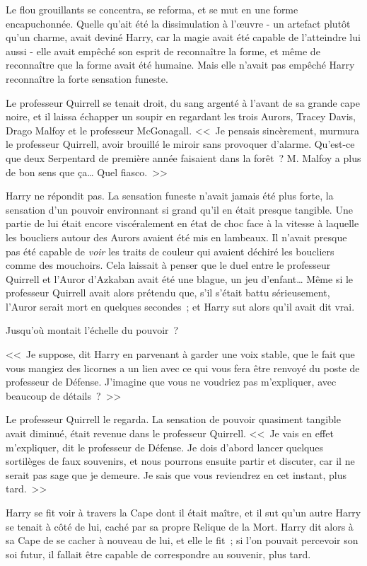 Le flou grouillants se concentra, se reforma, et se mut en une forme encapuchonnée. Quelle qu'ait été la dissimulation à l'œuvre - un artefact plutôt qu'un charme, avait deviné Harry, car la magie avait été capable de l'atteindre lui aussi - elle avait empêché son esprit de reconnaître la forme, et même de reconnaître que la forme avait été humaine. Mais elle n'avait pas empêché Harry reconnaître la forte sensation funeste.

Le professeur Quirrell se tenait droit, du sang argenté à l'avant de sa grande cape noire, et il laissa échapper un soupir en regardant les trois Aurors, Tracey Davis, Drago Malfoy et le professeur McGonagall. <<~Je pensais sincèrement, murmura le professeur Quirrell, avoir brouillé le miroir sans provoquer d'alarme. Qu'est-ce que deux Serpentard de première année faisaient dans la forêt~? M. Malfoy a plus de bon sens que ça… Quel fiasco.~>>

Harry ne répondit pas. La sensation funeste n'avait jamais été plus forte, la sensation d'un pouvoir environnant si grand qu'il en était presque tangible. Une partie de lui était encore viscéralement en état de choc face à la vitesse à laquelle les boucliers autour des Aurors avaient été mis en lambeaux. Il n'avait presque pas été capable de \emph{voir} les traits de couleur qui avaient déchiré les boucliers comme des mouchoirs. Cela laissait à penser que le duel entre le professeur Quirrell et l'Auror d'Azkaban avait été une blague, un jeu d'enfant… Même si le professeur Quirrell avait alors prétendu que, s'il s'était battu sérieusement, l'Auror serait mort en quelques secondes~; et Harry sut alors qu'il avait dit vrai.

Jusqu'où montait l'échelle du pouvoir~?

<<~Je suppose, dit Harry en parvenant à garder une voix stable, que le fait que vous mangiez des licornes a un lien avec ce qui vous fera être renvoyé du poste de professeur de Défense. J'imagine que vous ne voudriez pas m'expliquer, avec beaucoup de détails~?~>>

Le professeur Quirrell le regarda. La sensation de pouvoir quasiment tangible avait diminué, était revenue dans le professeur Quirrell. <<~Je vais en effet m'expliquer, dit le professeur de Défense. Je dois d'abord lancer quelques sortilèges de faux souvenirs, et nous pourrons ensuite partir et discuter, car il ne serait pas sage que je demeure. Je sais que vous reviendrez en cet instant, plus tard.~>>

Harry se fit voir à travers la Cape dont il était maître, et il sut qu'un autre Harry se tenait à côté de lui, caché par sa propre Relique de la Mort. Harry dit alors à sa Cape de se cacher à nouveau de lui, et elle le fit~; si l'on pouvait percevoir son soi futur, il fallait être capable de correspondre au souvenir, plus tard.

